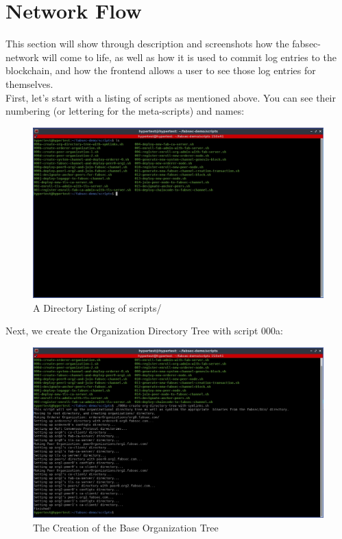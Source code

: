 \section{Network Flow}
	\hspace{10mm}This section will show through description and screenshots how the fabsec-network will come to life, as well as how it is used to commit log entries to the blockchain, and how the frontend allows a user to see those log entries for themselves.\\
	
	\hspace{10mm}First, let's start with a listing of scripts as mentioned above. You can see their numbering (or lettering for the meta-scripts) and names:
	
		\begin{figure}[H]
		\includegraphics[width=\textwidth]{./fabsec-report-network-flow/network-flow-1.jpg}
		\caption{A Directory Listing of scripts/}
		\end{figure}
	
	\newpage	
	\hspace{10mm}Next, we create the Organization Directory Tree with script 000a:
	
		\begin{figure}[H]
		\includegraphics[width=\textwidth]{./fabsec-report-network-flow/network-flow-2.jpg}
		\caption{The Creation of the Base Organization Tree}
		\end{figure}
	
